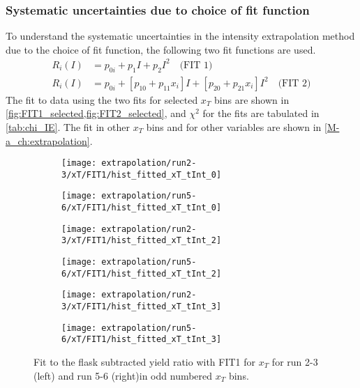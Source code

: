 \documentclass[../main.tex]{subfiles}
\begin{document}
\subsubsection{Systematic uncertainties due to choice of fit function}
To understand the systematic uncertainties in the intensity extrapolation method due to the
choice of fit function, the following two fit functions are used.
\begin{align}
	R_i\left(I\right) & = p_{0i} + p_{1} I + p_{2} I^2 \quad\text{(FIT 1)}                                                     \\
	R_i\left(I\right) & = p_{0i} + \left[p_{10} + p_{11}x_i\right] I + \left[p_{20} + p_{21}x_i\right]I^2 \quad \text{(FIT 2)}
	\label{eq:fit_functions}
\end{align}
The fit to data using the two fits for selected $x_T$ bins are shown in \cref{fig:FIT1_selected,fig:FIT2_selected},
and $\chi^2$ for the fits are tabulated in \cref{tab:chi_IE}.
The fit in other $x_T$ bins and for other variables are shown in \cref{M-a_ch:extrapolation}.
%
%
\begin{figure}[h!]
	\centering
	\begin{subfigure}{0.45\linewidth}
		\texttt{[image: extrapolation/run2-3/xT/FIT1/hist\_fitted\_xT\_tInt\_0]}
	\end{subfigure}
	\begin{subfigure}{0.45\linewidth}
		\texttt{[image: extrapolation/run5-6/xT/FIT1/hist\_fitted\_xT\_tInt\_0]}
	\end{subfigure}
	\begin{subfigure}{0.45\linewidth}
		\texttt{[image: extrapolation/run2-3/xT/FIT1/hist\_fitted\_xT\_tInt\_2]}
	\end{subfigure}
	\begin{subfigure}{0.45\linewidth}
		\texttt{[image: extrapolation/run5-6/xT/FIT1/hist\_fitted\_xT\_tInt\_2]}
	\end{subfigure}
	\begin{subfigure}{0.45\linewidth}
		\texttt{[image: extrapolation/run2-3/xT/FIT1/hist\_fitted\_xT\_tInt\_3]}
	\end{subfigure}
	\begin{subfigure}{0.45\linewidth}
		\texttt{[image: extrapolation/run5-6/xT/FIT1/hist\_fitted\_xT\_tInt\_3]}
	\end{subfigure}
	\caption{Fit to the flask subtracted yield ratio with FIT1 for $x_T$ for run 2-3 (left) and run 5-6 (right)in odd numbered $x_T$ bins.}
	\label{fig:FIT1_selected}
\end{figure}
\end{document}
